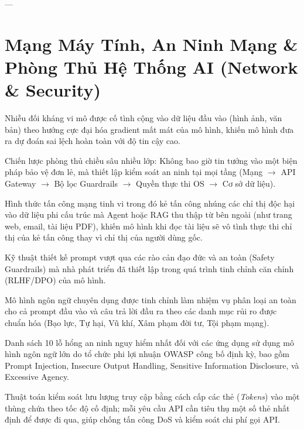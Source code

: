 ---

\section{Mạng Máy Tính, An Ninh Mạng \& Phòng Thủ Hệ Thống AI (Network \& Security)}
\label{sec:app-glossary-security}

\begin{description}[leftmargin=2.5cm, style=nextline]
  \item[\term{Adversarial Perturbation}] Nhiễu đối kháng vi mô được cố tình cộng vào dữ liệu đầu vào (hình ảnh, văn bản) theo hướng cực đại hóa gradient mất mát của mô hình, khiến mô hình đưa ra dự đoán sai lệch hoàn toàn với độ tin cậy cao.

  \item[\term{Defense-in-Depth}] Chiến lược phòng thủ chiều sâu nhiều lớp: Không bao giờ tin tưởng vào một biện pháp bảo vệ đơn lẻ, mà thiết lập kiểm soát an ninh tại mọi tầng (Mạng $\to$ API Gateway $\to$ Bộ lọc Guardrails $\to$ Quyền thực thi OS $\to$ Cơ sở dữ liệu).

  \item[\term{Indirect Prompt Injection}] Hình thức tấn công mạng tinh vi trong đó kẻ tấn công nhúng các chỉ thị độc hại vào dữ liệu phi cấu trúc mà Agent hoặc RAG thu thập từ bên ngoài (như trang web, email, tài liệu PDF), khiến mô hình khi đọc tài liệu sẽ vô tình thực thi chỉ thị của kẻ tấn công thay vì chỉ thị của người dùng gốc.

  \item[\term{Jailbreak Attack}] Kỹ thuật thiết kế prompt vượt qua các rào cản đạo đức và an toàn (Safety Guardrails) mà nhà phát triển đã thiết lập trong quá trình tinh chỉnh căn chỉnh (RLHF/DPO) của mô hình.

  \item[\term{Llama Guard}] Mô hình ngôn ngữ chuyên dụng được tinh chỉnh làm nhiệm vụ phân loại an toàn cho cả prompt đầu vào và câu trả lời đầu ra theo các danh mục rủi ro được chuẩn hóa (Bạo lực, Tự hại, Vũ khí, Xâm phạm đời tư, Tội phạm mạng).

  \item[\term{OWASP Top 10 for LLM Applications}] Danh sách 10 lỗ hổng an ninh nguy hiểm nhất đối với các ứng dụng sử dụng mô hình ngôn ngữ lớn do tổ chức phi lợi nhuận OWASP công bố định kỳ, bao gồm Prompt Injection, Insecure Output Handling, Sensitive Information Disclosure, và Excessive Agency.

  \item[\term{Rate Limiting (Token Bucket)}] Thuật toán kiểm soát lưu lượng truy cập bằng cách cấp các thẻ (\textit{Tokens}) vào một thùng chứa theo tốc độ cố định; mỗi yêu cầu API cần tiêu thụ một số thẻ nhất định để được đi qua, giúp chống tấn công DoS và kiểm soát chi phí gọi API.


\end{description}
